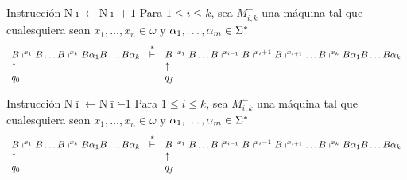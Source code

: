 \begin{frame}
	\begin{block}{Instrucción $\mathrm{N}\bar{\imath} \leftarrow \mathrm{N}\bar{\imath} + 1$}
		\PN Para $1 \leq i \leq k$, sea $M_{i,k}^{+}$ una máquina tal que cualesquiera sean $x_{1}, \dotsc, x_{n} \in
		\omega$ y $\alpha_{1}, \dotsc,\alpha_{m} \in \Sigma^{\ast}$
		\minLetter
		\[
			\begin{array}{lcl}
				B \shortmid^{x_{1}} B \dotsc B \shortmid^{x_{k}} B \alpha_{1} B \dotsc B \alpha_{k} &\overset{\ast}{\vdash}& B
				\shortmid^{x_{1}} B \dotsc B \shortmid^{x_{i-1}} B \shortmid^{x_{i}+1} B \shortmid^{x_{i+1}} \dotsc B
				\shortmid^{x_{k}} B \alpha_{1} B \dotsc B \alpha_{k} \\
				\uparrow && \uparrow \\
				q_{0} & & q_{f}
			\end{array}
		\]
	\end{block}

	\begin{block}{Instrucción $\mathrm{N}\bar{\imath} \leftarrow \mathrm{N}\bar{\imath} \dot{-} 1$}
		\PN Para $1 \leq i \leq k$, sea $M_{i,k}^{\dot{-}}$ una máquina tal que cualesquiera sean $x_{1}, \dotsc, x_{n} \in
		\omega$ y $\alpha_{1}, \dotsc,\alpha_{m} \in \Sigma^{\ast}$
		\minLetter
		\[
			\begin{array}{lcl}
				B \shortmid^{x_{1}} B \dotsc B \shortmid^{x_{k}} B \alpha_{1} B \dotsc B \alpha_{k} &\overset{\ast}{\vdash}& B
					\shortmid^{x_{1}} B \dotsc B \shortmid^{x_{i-1}} B \shortmid^{x_{i} \dot{-} 1} B \shortmid^{x_{i+1}} \dotsc B
					\shortmid^{x_{k}} B \alpha_{1} B \dotsc B \alpha_{k} \\
				\uparrow && \uparrow \\
				q_{0} && q_{f}
			\end{array}
		\]
	\end{block}
\end{frame}
